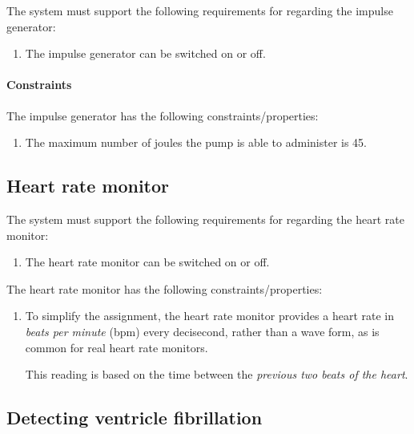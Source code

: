 \documentclass[11pt]{article}
\begin{document}
The system must support the following requirements for regarding the impulse generator:

\begin{enumerate}

 \item The impulse generator can be switched on or off.

\end{enumerate}

\paragraph{Constraints} The impulse generator has the following constraints/properties:

\begin{enumerate}

 \item The maximum number of joules the pump is able to administer is 45.

\end{enumerate}

\subsection{Heart rate monitor}

The system must support the following requirements for regarding the heart rate monitor:

\begin{enumerate}

 \item The heart rate monitor can be switched on or off.

\end{enumerate}

The heart rate monitor has the following constraints/properties:

\begin{enumerate}

 \item To simplify the assignment, the heart rate monitor provides  a heart rate in \emph{beats per minute} (bpm) every decisecond, rather than a wave form, as is common for real heart rate monitors. 

 This reading is based on the time between the \emph{previous two beats of the heart}.

\end{enumerate}


\subsection{Detecting ventricle fibrillation}
\label{sec:vf}
\end{document}
